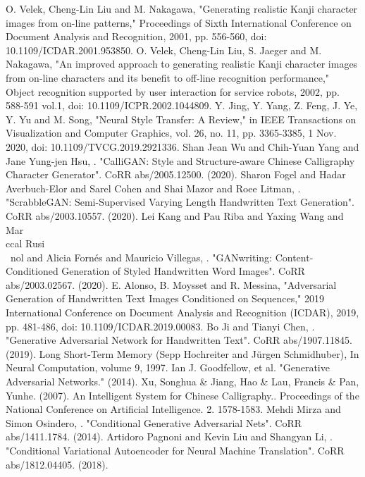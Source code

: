 \documentclass[12pt]{report}
\begin{document}
\begin{thebibliography}{9}
	 O. Velek, Cheng-Lin Liu and M. Nakagawa, "Generating realistic Kanji character images from on-line patterns," Proceedings of Sixth International Conference on Document Analysis and Recognition, 2001, pp. 556-560, doi: 10.1109/ICDAR.2001.953850.
	 O. Velek, Cheng-Lin Liu, S. Jaeger and M. Nakagawa, "An improved approach to generating realistic Kanji character images from on-line characters and its benefit to off-line recognition performance," Object recognition supported by user interaction for service robots, 2002, pp. 588-591 vol.1, doi: 10.1109/ICPR.2002.1044809.
	Y. Jing, Y. Yang, Z. Feng, J. Ye, Y. Yu and M. Song, "Neural Style Transfer: A Review," in IEEE Transactions on Visualization and Computer Graphics, vol. 26, no. 11, pp. 3365-3385, 1 Nov. 2020, doi: 10.1109/TVCG.2019.2921336.
	 Shan Jean Wu and Chih-Yuan Yang and Jane Yung-jen Hsu, . "CalliGAN: Style and Structure-aware Chinese Calligraphy Character Generator". CoRR abs/2005.12500. (2020).
	 Sharon Fogel and Hadar Averbuch-Elor and Sarel Cohen and Shai Mazor and Roee Litman, . "ScrabbleGAN: Semi-Supervised Varying Length Handwritten Text Generation". CoRR abs/2003.10557. (2020).
	Lei Kang and Pau Riba and Yaxing Wang and Mar\\ccal Rusi\\~nol and Alicia Fornés and Mauricio Villegas, . "GANwriting: Content-Conditioned Generation of Styled Handwritten Word Images". CoRR abs/2003.02567. (2020).
	 E. Alonso, B. Moysset and R. Messina, "Adversarial Generation of Handwritten Text Images Conditioned on Sequences," 2019 International Conference on Document Analysis and Recognition (ICDAR), 2019, pp. 481-486, doi: 10.1109/ICDAR.2019.00083.
	 Bo Ji and Tianyi Chen, . "Generative Adversarial Network for Handwritten Text". CoRR abs/1907.11845. (2019).
	 Long Short-Term Memory (Sepp Hochreiter and Jürgen Schmidhuber), In Neural Computation, volume 9, 1997.
	 Ian J. Goodfellow, et al. "Generative Adversarial Networks." (2014). 
	Xu, Songhua \& Jiang, Hao \& Lau, Francis \& Pan, Yunhe. (2007). An Intelligent System for Chinese Calligraphy.. Proceedings of the National Conference on Artificial Intelligence. 2. 1578-1583. 
	Mehdi Mirza and Simon Osindero, . "Conditional Generative Adversarial Nets". CoRR abs/1411.1784. (2014).
	Artidoro Pagnoni and Kevin Liu and Shangyan Li, . "Conditional Variational Autoencoder for Neural Machine Translation". CoRR abs/1812.04405. (2018).

\end{thebibliography}
\end{document}

